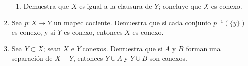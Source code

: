 \documentclass[11pt]{article}
\begin{document}
\begin{enumerate}
\begin{enumerate}
        \item Demuestra que $X$ es igual a la clausura de $Y$; concluye que $X$ es conexo.
    \end{enumerate}
    
    \item Sea $p : X \to Y$ un mapeo cociente. Demuestra que si cada conjunto $p^{-1}(\{y\})$ es conexo, y si $Y$ es conexo, entonces $X$ es conexo.
    
    \item Sea $Y \subset X$; sean $X$ e $Y$ conexos. Demuestra que si $A$ y $B$ forman una separación de $X - Y$, entonces $Y \cup A$ y $Y \cup B$ son conexos.

\end{enumerate}
   
\end{document}

